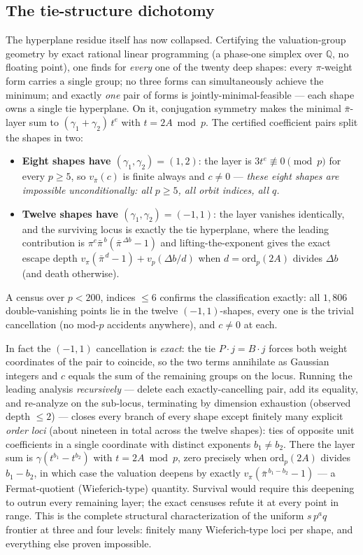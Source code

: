 \documentclass[11pt]{article}
\theoremstyle{remark}
\begin{document}
\subsection*{The tie-structure dichotomy}

The hyperplane residue itself has now collapsed.  Certifying the
valuation-group geometry by exact rational linear programming (a phase-one
simplex over $\mathbb{Q}$, no floating point), one finds for \emph{every}
one of the twenty deep shapes: every $\pi$-weight form carries a single
group; no three forms can simultaneously achieve the minimum; and exactly
\emph{one} pair of forms is jointly-minimal-feasible --- each shape owns a
single tie hyperplane.  On it, conjugation symmetry makes the minimal
$\bar\pi$-layer sum to $(\gamma_1+\gamma_2)\,t^{e}$ with $t = 2A \bmod p$.
The certified coefficient pairs split the shapes in two:
\begin{itemize}
\item \textbf{Eight shapes have $(\gamma_1,\gamma_2)=(1,2)$}: the layer is
$3t^{e}\not\equiv 0 \pmod p$ for every $p\ge 5$, so $v_{\bar\pi}(c)$ is
finite always and $c\ne 0$ --- \emph{these eight shapes are impossible
unconditionally: all $p\ge 5$, all orbit indices, all $q$.}
\item \textbf{Twelve shapes have $(\gamma_1,\gamma_2)=(-1,1)$}: the layer
vanishes identically, and the surviving locus is exactly the tie
hyperplane, where the leading contribution is
$\pi^{e}\bar\pi^{\,b}(\bar\pi^{\,\Delta b}-1)$ and lifting-the-exponent
gives the exact escape depth $v_\pi(\bar\pi^{\,d}-1)+v_p(\Delta b/d)$ when
$d=\mathrm{ord}_p(2A)$ divides $\Delta b$ (and death otherwise).
\end{itemize}
A census over $p<200$, indices $\le 6$ confirms the classification
exactly: all $1{,}806$ double-vanishing points lie in the twelve
$(-1,1)$-shapes, every one is the trivial cancellation (no mod-$p$
accidents anywhere), and $c\ne 0$ at each.

In fact the $(-1,1)$ cancellation is \emph{exact}: the tie
$P\!\cdot\!j = B\!\cdot\!j$ forces both weight coordinates of the pair
to coincide, so the two terms annihilate as Gaussian integers and $c$
equals the sum of the remaining groups on the locus.  Running the
leading analysis \emph{recursively} — delete each exactly-cancelling
pair, add its equality, and re-analyze on the sub-locus, terminating by
dimension exhaustion (observed depth $\le 2$) — closes every branch of
every shape except finitely many explicit \emph{order loci} (about
nineteen in total across the twelve shapes): ties of opposite unit
coefficients in a single coordinate with distinct exponents
$b_1\ne b_2$.  There the layer sum is $\gamma(t^{b_1}-t^{b_2})$ with
$t = 2A \bmod p$, zero precisely when $\mathrm{ord}_p(2A)$ divides
$b_1-b_2$, in which case the valuation deepens by exactly
$v_\pi(\bar\pi^{\,b_1-b_2}-1)$ — a Fermat-quotient (Wieferich-type)
quantity.  Survival would require this deepening to outrun every
remaining layer; the exact censuses refute it at every point in range.
This is the complete structural characterization of the uniform
$s\,p^aq$ frontier at three and four levels: finitely many
Wieferich-type loci per shape, and everything else proven impossible.
\end{document}
